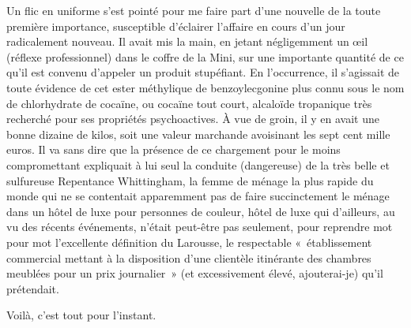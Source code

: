 %
Un flic en uniforme s’est pointé pour me faire part d’une nouvelle de la toute première importance, susceptible d’éclairer l’affaire en cours d’un jour radicalement nouveau. Il avait mis la main, en jetant négligemment un œil (réflexe professionnel) dans le coffre de la Mini, sur une importante quantité de ce qu’il est convenu d’appeler un produit stupéfiant. En l’occurrence, il s’agissait de toute évidence de cet ester méthylique de benzoylecgonine plus connu sous le nom de chlorhydrate de cocaïne, ou cocaïne tout court, alcaloïde tropanique très recherché pour ses propriétés psychoactives. À vue de groin, il y en avait une bonne dizaine de kilos, soit une valeur marchande avoisinant les sept cent mille euros. Il va sans dire que la présence de ce chargement pour le moins compromettant expliquait à lui seul la conduite (dangereuse) de la très belle et sulfureuse Repentance Whittingham, la femme de ménage la plus rapide du monde qui ne se contentait apparemment pas de faire succinctement le ménage dans un hôtel de luxe pour personnes de couleur, hôtel de luxe qui d’ailleurs, au vu des récents événements, n’était peut-être pas seulement, pour reprendre mot pour mot l’excellente définition du Larousse, le respectable «~établissement commercial mettant à la disposition d’une clientèle itinérante des chambres meublées pour un prix journalier~» (et excessivement élevé, ajouterai-je) qu’il prétendait.

Voilà, c’est tout pour l’instant.

